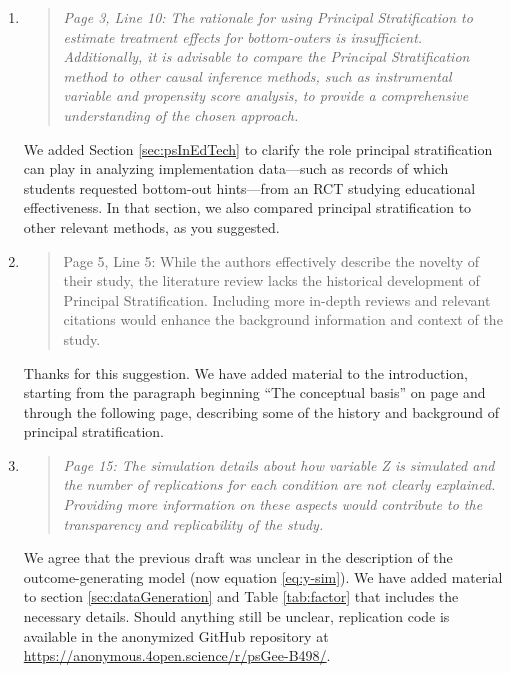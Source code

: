 \documentclass[]{article}
\newenvironment{itquote}
  {\begin{quote} \itshape}
  {\end{quote}\ignorespacesafterend}
\begin{document}
\begin{enumerate}
 
\item    \begin{itquote}  Page 3, Line 10: The rationale for using Principal Stratification to estimate treatment effects for bottom-outers is insufficient. Additionally, it is advisable to compare the Principal Stratification method to other causal inference methods, such as instrumental variable and propensity score analysis, to provide a comprehensive understanding of the chosen approach.
\end{itquote}

We added Section \ref{sec:psInEdTech} to clarify the role principal stratification can play in analyzing implementation data---such as records of which students requested bottom-out hints---from an RCT studying educational effectiveness. 
In that section, we also compared principal stratification to other relevant methods, as you suggested. 

\item \begin{itquote}
    
     Page 5, Line 5: While the authors effectively describe the novelty of their study, the literature review lacks the historical development of Principal Stratification. Including more in-depth reviews and relevant citations would enhance the background information and context of the study.
\end{itquote}

Thanks for this suggestion. We have added material to the introduction, starting from the paragraph beginning ``The conceptual basis'' on page \pageref{background} and through the following page, describing some of the history and background of principal stratification. 

\item \begin{itquote}
     Page 15: The simulation details about how variable Z is simulated and the number of replications for each condition are not clearly explained. Providing more information on these aspects would contribute to the transparency and replicability of the study.
\end{itquote}
We agree that the previous draft was unclear in the description of the outcome-generating model (now equation \ref{eq:y-sim}). We have added material to section \ref{sec:dataGeneration} and Table \ref{tab:factor} that includes the necessary details. Should anything still be unclear, replication code is available in the anonymized GitHub repository at \url{https://anonymous.4open.science/r/psGee-B498/}.



\end{enumerate}
\end{document}
